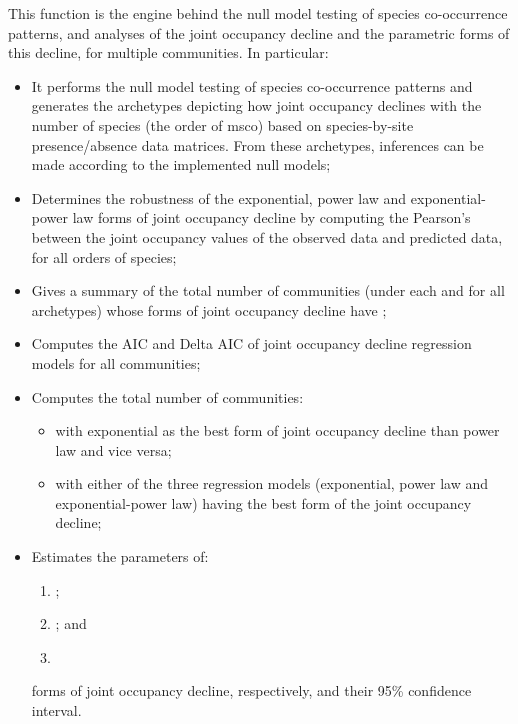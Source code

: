 \documentclass[a4paper]{book}
\begin{document}
\begin{Description}\relax
This function is the engine behind the null model testing of species co-occurrence patterns, and
analyses of the joint occupancy decline and the parametric forms of this decline, for multiple
communities. In particular:
\begin{itemize}

\item{} It performs the null model testing of species co-occurrence patterns and generates the
archetypes depicting how joint occupancy declines with the number of species (the order
of msco) based on species-by-site presence/absence  data matrices. From these archetypes,
inferences can be made according to the implemented null models;
\item{} Determines the robustness of the exponential, power law and exponential-power law forms of
joint occupancy decline by computing the Pearson's  between the joint occupancy values
of the observed data and predicted data, for all orders of species;
\item{} Gives a summary of the total number of communities (under each and for all archetypes) whose
forms of joint occupancy decline have ;
\item{} Computes the AIC and Delta AIC of joint occupancy decline regression models for all communities;
\item{} Computes the total number of communities:
\begin{itemize}

\item{} with exponential as the best form of joint occupancy decline than power law and vice versa;
\item{} with either of the three regression models (exponential, power law and exponential-power law)
having the best form of the joint occupancy decline;
\end{itemize}

\item{} Estimates the parameters of:
\begin{enumerate}

\item{}  ;
\item{}  ; and
\item{}  

\end{enumerate}
forms of joint occupancy decline, respectively, and their 95\% confidence interval.
\end{itemize}

\end{Description}
\end{document}
